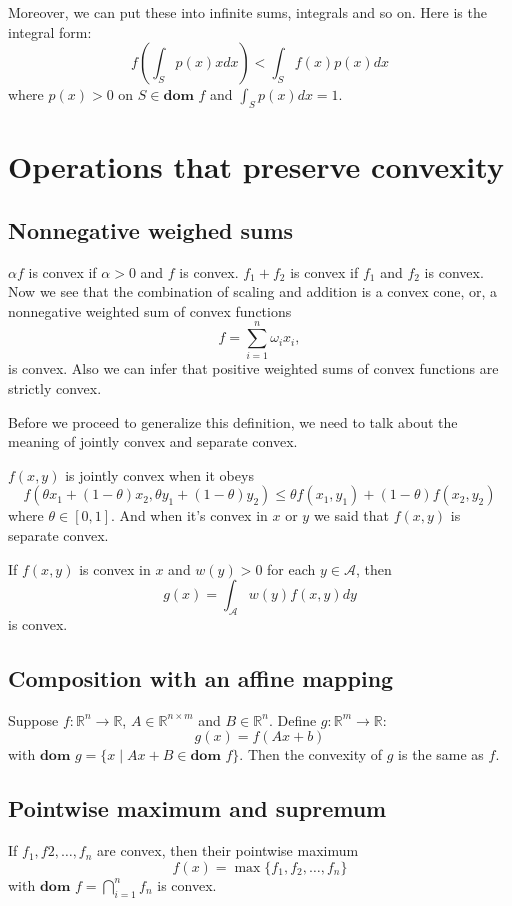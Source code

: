 \documentclass[lang=en,color=blue,mode=fancy,titlestyle=hang]{elegantbook}
\begin{document}
Moreover, we can put these into infinite sums, integrals and so on. Here is the integral
form:
\[
f(\int_S p(x)x dx) < \int_S f(x)p(x) dx
\]
where $p(x) > 0$ on $S \in \textbf{dom } f$ and $\int_S p(x) dx = 1$.

\section{Operations that preserve convexity}
\subsection{Nonnegative weighed sums}

$\alpha f$ is convex if $\alpha > 0 $ and $f$ is convex. $f_1 + f_2$ is convex if $f_1$
and $f_2$ is convex. Now we see that the combination of scaling and addition is a convex
cone, or, a nonnegative weighted sum of convex functions
\[
f = \sum_{i = 1}^n \omega_i x_i,
\]
is convex. Also we can infer that positive weighted sums of convex functions are strictly
convex.

Before we proceed to generalize this definition, we need to talk about the meaning of
jointly convex and separate convex.

$f(x, y)$ is jointly convex when it obeys
\[
f(\theta x_1 + (1 - \theta) x_2, \theta y_1 + (1 - \theta) y_2) \leq \theta f(x_1, y_1) + (1 - \theta) f(x_2, y_2)
\]
where $\theta \in [0, 1]$. And when it's convex in $x$ or $y$ we said that $f(x, y)$ is
separate convex.

If $f(x, y)$ is convex in $x$ and $w(y) > 0$ for each $y \in \mathcal{A}$, then
\[
g(x) = \int_{\mathcal{A}} w(y) f(x, y) dy
\]
is convex.

\subsection{Composition with an affine mapping}

Suppose $f: \mathbb{R}^n \rightarrow \mathbb{R}$, $A \in \mathbb{R}^{n \times m}$ and
$B \in \mathbb{R}^n$. Define $g: \mathbb{R}^m \rightarrow \mathbb{R}$:
\[
g(x) = f(A x + b)
\]
with $\textbf{dom } g = \{x \;|\; A x + B \in \textbf{dom } f\}$. Then the convexity of
$g$ is the same as $f$.

\subsection{Pointwise maximum and supremum}

If $f_1, f2, \ldots, f_n$ are convex, then their pointwise maximum
\[
f(x) = \max\{f_1, f_2, \ldots, f_n\}
\]
with $\textbf{dom } f = \bigcap_{i = 1}^n f_n$ is convex.
\end{document}
